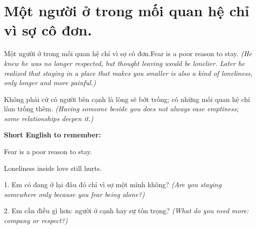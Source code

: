 \section{Một người ở trong mối quan hệ chỉ vì sợ cô đơn.}
\begin{truyen}{Một người ở trong mối quan hệ chỉ vì sợ cô đơn.}{Fear is a poor reason to stay.}
\textit{(He knew he was no longer respected, but thought leaving would be lonelier. Later he realized that staying in a place that makes you smaller is also a kind of loneliness, only longer and more painful.)}
\end{truyen}
\begin{baihoc}
Không phải cứ có người bên cạnh là lòng sẽ bớt trống; có những mối quan hệ chỉ làm trống thêm.
\textit{(Having someone beside you does not always ease emptiness; some relationships deepen it.)}
\end{baihoc}
\begin{ghinhoanh}
\textbf{Short English to remember:}

Fear is a poor reason to stay.

Loneliness inside love still hurts.
\end{ghinhoanh}
\begin{tuhocnhanh}
1. Em có đang ở lại đâu đó chỉ vì sợ một mình không? \textit{(Are you staying somewhere only because you fear being alone?)}

2. Em cần điều gì hơn: người ở cạnh hay sự tôn trọng? \textit{(What do you need more: company or respect?)}
\end{tuhocnhanh}
\ngancach

